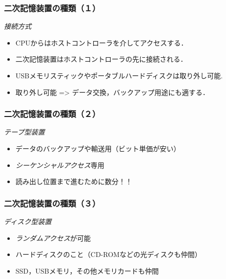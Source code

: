 \documentclass[unicode]{beamer}                   %
\begin{document}
\begin{frame}
  \frametitle{二次記憶装置の種類（１）}
  \emph{接続方式}
  \begin{itemize}
  \item CPUからはホストコントローラを介してアクセスする．
  \item 二次記憶装置はホストコントローラの先に接続される．
  \item USBメモリスティックやポータブルハードディスクは取り外し可能.
  \item 取り外し可能 => データ交換，バックアップ用途にも適する．
  \end{itemize}
\end{frame}

\begin{frame}
  \frametitle{二次記憶装置の種類（２）}
  \emph{テープ型装置}
  \begin{itemize}
  \item データのバックアップや輸送用（ビット単価が安い）
  \item \emph{シーケンシャルアクセス}専用
  \item 読み出し位置まで進むために数分！！
  \end{itemize}
\end{frame}

\begin{frame}
  \frametitle{二次記憶装置の種類（３）}
  \emph{ディスク型装置}
  \begin{itemize}
  \item \emph{ランダムアクセス}が可能
  \item ハードディスクのこと（CD-ROMなどの光ディスクも仲間）
  \item SSD，USBメモリ，その他メモリカードも仲間
  \end{itemize}
\end{frame}
\end{document}
